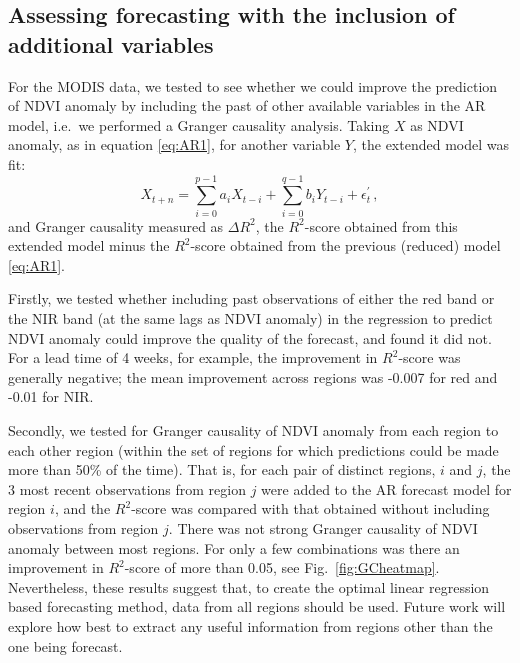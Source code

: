 \documentclass[review]{elsarticle}
\begin{document}
\newpage

\subsection{Assessing forecasting with the inclusion of additional variables} 

For the MODIS data, we tested to see whether we could improve the prediction of NDVI anomaly by including the past of other available variables in the AR model, i.e.~we performed a Granger causality analysis. Taking $X$ as NDVI anomaly, as in equation \eqref{eq:AR1}, for another variable $Y$, the extended model was fit:
\begin{equation}
X_{t+n}=\sum_{i=0}^{p-1}a_iX_{t-i}+\sum_{i=0}^{q-1}b_iY_{t-i}+\epsilon^{\prime}_t\,,
\end{equation}
and Granger causality measured as $\Delta R^2$, the $R^2$-score obtained from this extended model minus the $R^2$-score obtained  from the previous (reduced) model \eqref{eq:AR1}. 

Firstly, we tested whether including past observations of either the red band or the NIR band (at the same lags as NDVI anomaly) in the regression to predict NDVI anomaly could improve the quality of the forecast, and found it did not. For a lead time of 4 weeks, for example, the improvement in $R^2$-score was generally negative; the mean improvement across regions was -0.007 for red and -0.01 for NIR.

Secondly, we tested for Granger causality of NDVI anomaly from each region to each other region (within the set of regions for which predictions could be made more than 50\% of the time). That is, for each pair of distinct regions, $i$ and $j$, the 3 most recent observations from region $j$ were added to the AR forecast model for region $i$, and the $R^2$-score was compared with that obtained without including observations from region $j$. There was not strong Granger causality of NDVI anomaly between most regions. For only a few combinations was there an improvement in $R^2$-score of more than 0.05, see Fig.~\ref{fig:GCheatmap}. Nevertheless, these results suggest that, to create the optimal linear regression based forecasting method, data from all regions should be used. Future work will explore how best to extract any useful information from regions other than the one being forecast.
\end{document}
